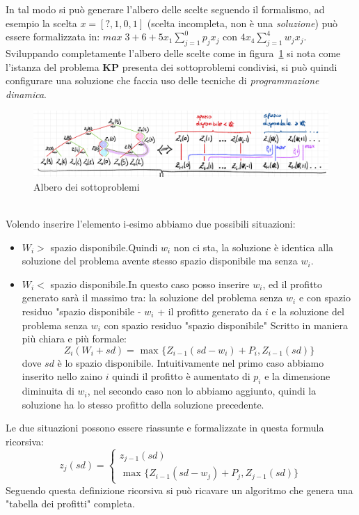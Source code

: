 \documentclass[a4paper]{article}
\begin{document}
In tal modo si può generare l'albero delle scelte seguendo il formalismo, ad esempio la scelta $x=[?,1, 0 ,1]$ (scelta incompleta, non è una \textit{soluzione}) può essere formalizzata in:
$max\; 3 + 6 +5x_1 \sum_{j=1}^0 p_jx_j \text{ con } 4x_4\sum_{j=1}^4 w_jx_j$.\\
Sviluppando completamente l'albero delle scelte come in figura~\ref{FIG:D1_albero} si nota come l'istanza del problema \textbf{KP} presenta dei sottoproblemi condivisi, si può quindi configurare una soluzione che faccia uso delle tecniche di \textit{programmazione dinamica}.
\begin{figure}[!ht]
\centering
\includegraphics[width=1\textwidth]{./img/D1_albero}
\caption{Albero dei sottoproblemi} \label{FIG:D1_albero}
\end{figure}\\
Volendo inserire l'elemento i-esimo abbiamo due possibili situazioni:
\begin{itemize}
	\item$W_i >$ spazio disponibile.Quindi $w_i$ non ci sta, la soluzione è identica alla soluzione del problema avente stesso spazio disponibile ma senza $w_i$.
	\item$W_i <$ spazio disponibile.In questo caso posso inserire $w_i$, ed il profitto generato sarà il massimo tra: la soluzione del problema senza $w_i$ e con spazio residuo "spazio disponibile - $w_i$ + il profitto generato da $i$ e la soluzione del problema senza $w_i$ con spazio residuo "spazio disponibile"
		Scritto in maniera più chiara e più formale: $$Z_i(W_i + sd)= \text{ max } \{ Z_{i-1}(sd - w_i) + P_i , Z_{i-1}(sd) \}$$ dove $sd$ è lo spazio disponibile.
		Intuitivamente nel primo caso abbiamo inserito nello zaino $i$ quindi il profitto è aumentato di $p_i$ e la dimensione diminuita di $w_i$, nel secondo caso non lo abbiamo aggiunto, quindi la soluzione ha lo stesso profitto della soluzione precedente.
\end{itemize}
Le due situazioni possono essere riassunte e formalizzate in questa formula ricorsiva:
\begin{equation*}
	z_j(sd)= \begin{cases} z_{j-1}(sd)\\ 
	\text{ max } \{ Z_{i-1}(sd - w_j) + P_j , Z_{j-1}(sd) \}
\end{cases}
\end{equation*}
Seguendo questa definizione ricorsiva si può ricavare un algoritmo che genera una "tabella dei profitti" completa.
\end{document}
